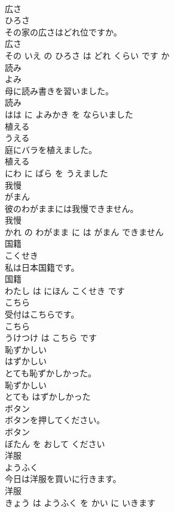 \documentclass[8pt]{extreport}
\begin{document}
\begin{CJK}{UTF8}{min}
\\	広さ	
\\	ひろさ			
\\	その家の広さはどれ位ですか。	
\\	広さ 
\\	その いえ の ひろさ は どれ くらい です か			
\\	読み	
\\	よみ			
\\	母に読み書きを習いました。	
\\	読み 
\\	はは に よみかき を ならいました			
\\	植える	
\\	うえる			
\\	庭にバラを植えました。	
\\	植える 
\\	にわ に ばら を うえました			
\\	我慢	
\\	がまん			
\\	彼のわがままには我慢できません。	
\\	我慢 
\\	かれ の わがまま に は がまん できません			
\\	国籍	
\\	こくせき			
\\	私は日本国籍です。	
\\	国籍 
\\	わたし は にほん こくせき です			
\\	こちら	
\\	受付はこちらです。	
\\	こちら 
\\	うけつけ は こちら です			
\\	恥ずかしい	
\\	はずかしい			
\\	とても恥ずかしかった。	
\\	恥ずかしい 
\\	とても はずかしかった			
\\	ボタン	
\\	ボタンを押してください。	
\\	ボタン 
\\	ぼたん を おして ください			
\\	洋服	
\\	ようふく			
\\	今日は洋服を買いに行きます。	
\\	洋服 
\\	きょう は ようふく を かい に いきます			

\end{CJK}
\end{document}
